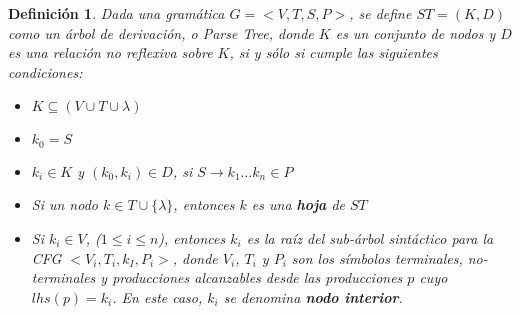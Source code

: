 \documentclass[a4paper]{article}
\newtheorem{definition}{Definición}[section]
\begin{document}
\begin{definition}
\label{def:arbolderivacion}
Dada una gramática $G = <V,T,S,P>$, se define $ST=(K,D)$ como un \emph{árbol de derivación}, 
o Parse Tree, donde $K$ es un conjunto de nodos y $D$ es una relación no reflexiva sobre $K$, 
si y sólo si cumple las siguientes condiciones:

\begin{itemize}
\item $ K \subseteq (V \cup T \cup \lambda) $
\item $k_{0} = S$
\item $k_i \in K$ y $(k_0,k_i) \in D$, si $S \rightarrow k_{1} \ldots k_{n} \in P$
\item Si un nodo $k \in T \cup \{\lambda\}$, entonces $k$ es una \textbf{hoja} de $ST$
\item Si $k_{i} \in V$,  ($1 \leq i \leq n$), entonces $k_{i}$ es la raíz del 
      sub-árbol sintáctico para la CFG $<V_{i},T_{i},k_I,P_{i}>$, donde $V_i$, $T_i$ y $P_i$
      son los símbolos terminales, no-terminales y producciones alcanzables desde las 
      producciones $p$ cuyo $lhs(p) = k_i$.
      En este caso, $k_i$ se denomina \textbf{nodo interior}.
\end{itemize}
\end{definition}
\end{document}
